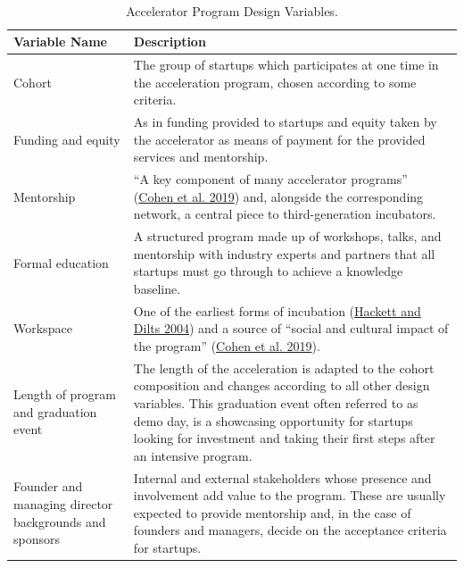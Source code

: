\documentclass[
  12pt,
]{article}
\begin{document}
~

\onehalfspacing





\begin{table}[H]

\caption{\label{tab:programvars}Accelerator Program Design Variables.}
\centering
\fontsize{9}{11}\selectfont
\begin{tabu} to 
\toprule
Variable Name & Description\\
\midrule
Cohort & The group of startups which participates at one time in the acceleration program, chosen according to some criteria.\\
\addlinespace
Funding and equity & As in funding provided to startups and equity taken by the accelerator as means of payment for the provided services and mentorship.\\
\addlinespace
Mentorship & “A key component of many accelerator programs” (\protect\hyperlink{ref-cohen_design_2019}{Cohen et al. 2019}) and, alongside the corresponding network, a central piece to third-generation incubators.\\
\addlinespace
Formal education & A structured program made up of workshops, talks, and mentorship with industry experts and partners that all startups must go through to achieve a knowledge baseline.\\
\addlinespace
Workspace & One of the earliest forms of incubation (\protect\hyperlink{ref-hackett_systematic_2004}{Hackett and Dilts 2004}) and a source of “social and cultural impact of the program” (\protect\hyperlink{ref-cohen_design_2019}{Cohen et al. 2019}).\\
\addlinespace
Length of program and graduation event & The length of the acceleration is adapted to the cohort composition and changes according to all other design variables. This graduation event often referred to as demo day, is a showcasing opportunity for startups looking for investment and taking their first steps after an intensive program.\\
\addlinespace
Founder and managing director backgrounds and sponsors & Internal and external stakeholders whose presence and involvement add value to the program. These are usually expected to provide mentorship and, in the case of founders and managers, decide on the acceptance criteria for startups.\\
\bottomrule
\end{tabu}
\end{table}
\end{document}

